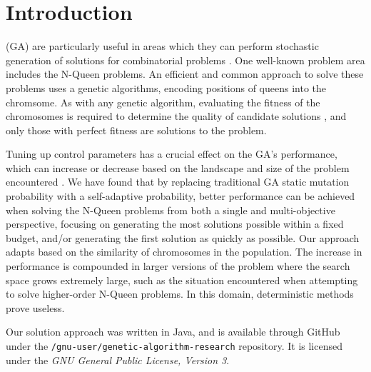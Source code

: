 \documentclass[conference]{IEEEtran}
\begin{document}
\section{Introduction}
 (GA) are particularly useful in areas which they can perform stochastic generation of solutions for combinatorial problems \cite{de1989using,crawford1992solving}. One well-known problem area includes the N-Queen problems. An efficient and common approach to solve these problems uses a genetic algorithms, encoding positions of queens into the chromsome. As with any genetic algorithm, evaluating the fitness of the chromosomes is required to determine the quality of candidate solutions \cite{srinivas1994genetic}, and only those with perfect fitness are solutions to the problem. 

Tuning up control parameters has a crucial effect on the GA's performance, which can increase or decrease based on the landscape and size of the problem encountered \cite{ye2010some,coyne1994genetic,srinivas1994adaptive}. We have found that by replacing traditional GA static mutation probability with a self-adaptive probability, better performance can be achieved when solving the N-Queen problems from both a single and multi-objective perspective, focusing on generating the most solutions possible within a fixed budget, and/or generating the first solution as quickly as possible. Our approach adapts based on the similarity of chromosomes in the population. The increase in performance is compounded in larger versions of the problem where the search space grows extremely large, such as the situation encountered when attempting to solve higher-order N-Queen problems. In this domain, deterministic methods prove useless.

Our solution approach was written in Java, and is available through GitHub under the \texttt{/gnu-user/genetic-algorithm-research} repository. It is licensed under the \textit{GNU General Public License, Version 3}.
\end{document}
